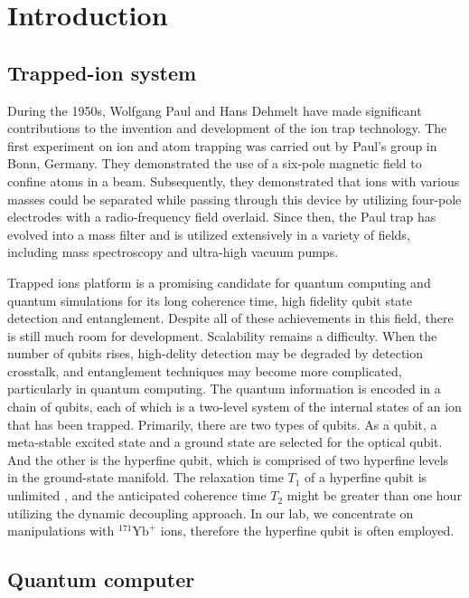 
\chapter{Introduction}

\section{Trapped-ion system}

During the 1950s, Wolfgang Paul and Hans Dehmelt have made significant contributions to the invention and development of the ion trap technology. The first experiment on ion and atom trapping was carried out by Paul's group in Bonn, Germany. They demonstrated the use of a six-pole magnetic field to confine atoms in a beam. Subsequently, they demonstrated that ions with various masses could be separated while passing through this device by utilizing four-pole electrodes with a radio-frequency field overlaid. Since then, the Paul trap has evolved into a mass filter and is utilized extensively in a variety of fields, including mass spectroscopy and ultra-high vacuum pumps.

Trapped ions platform is a promising candidate for quantum computing and quantum simulations for its long coherence time, high fidelity qubit state detection and entanglement. Despite all of these achievements in this field, there is still much room for development. Scalability remains a difficulty. When the number of qubits rises, high-delity detection may be degraded by detection crosstalk, and entanglement techniques may become more complicated, particularly in quantum computing. The quantum information is encoded in a chain of qubits, each of which is a two-level system of the internal states of an ion that has been trapped. Primarily, there are two types of qubits. As a qubit, a meta-stable excited state and a ground state are selected for the optical qubit. And the other is the hyperfine qubit, which is comprised of two hyperfine levels in the ground-state manifold. The relaxation time $T_1$ of a hyperfine qubit is unlimited , and the anticipated coherence time $T_2$ might be greater than one hour utilizing the dynamic decoupling approach. In our lab, we concentrate on manipulations with ${ }^{171} \mathrm{Yb}^{+}$ ions, therefore the hyperfine qubit is often employed.



\section{Quantum computer}

